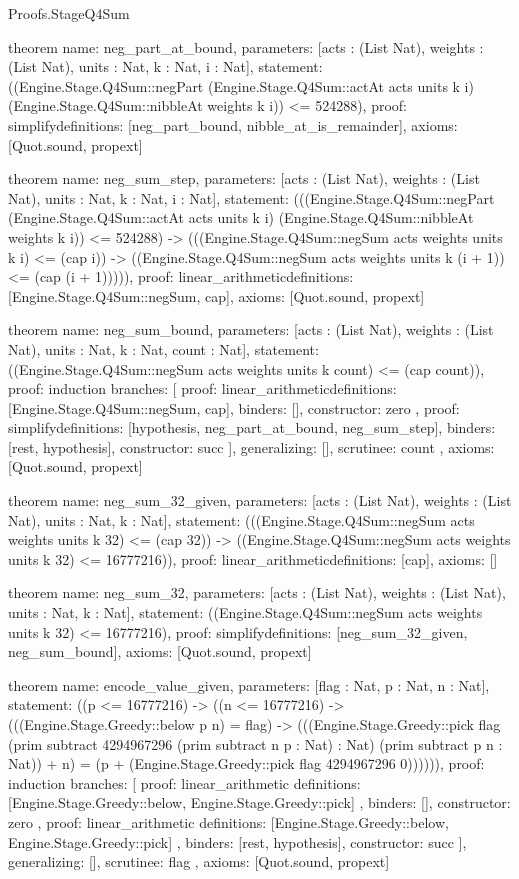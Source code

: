 \begin{lexlean}{Proofs.StageQ4Sum}
\begin{semanticmodule}
theorem{
  name: neg_part_at_bound,
  parameters: [acts : (List Nat), weights : (List Nat), units : Nat, k : Nat, i : Nat],
  statement: ((Engine.Stage.Q4Sum::negPart (Engine.Stage.Q4Sum::actAt acts units k i) (Engine.Stage.Q4Sum::nibbleAt weights k i)) <= 524288),
  proof: simplify{definitions: [neg_part_bound, nibble_at_is_remainder]},
  axioms: [Quot.sound, propext]
}

theorem{
  name: neg_sum_step,
  parameters: [acts : (List Nat), weights : (List Nat), units : Nat, k : Nat, i : Nat],
  statement: (((Engine.Stage.Q4Sum::negPart (Engine.Stage.Q4Sum::actAt acts units k i) (Engine.Stage.Q4Sum::nibbleAt weights k i)) <= 524288) -> (((Engine.Stage.Q4Sum::negSum acts weights units k i) <= (cap i)) -> ((Engine.Stage.Q4Sum::negSum acts weights units k (i + 1)) <= (cap (i + 1))))),
  proof: linear_arithmetic{definitions: [Engine.Stage.Q4Sum::negSum, cap]},
  axioms: [Quot.sound, propext]
}

theorem{
  name: neg_sum_bound,
  parameters: [acts : (List Nat), weights : (List Nat), units : Nat, k : Nat, count : Nat],
  statement: ((Engine.Stage.Q4Sum::negSum acts weights units k count) <= (cap count)),
  proof: induction{
    branches: [
      {
        proof: linear_arithmetic{definitions: [Engine.Stage.Q4Sum::negSum, cap]},
        binders: [],
        constructor: zero
      },
      {
        proof: simplify{definitions: [hypothesis, neg_part_at_bound, neg_sum_step]},
        binders: [rest, hypothesis],
        constructor: succ
      }
    ],
    generalizing: [],
    scrutinee: count
  },
  axioms: [Quot.sound, propext]
}

theorem{
  name: neg_sum_32_given,
  parameters: [acts : (List Nat), weights : (List Nat), units : Nat, k : Nat],
  statement: (((Engine.Stage.Q4Sum::negSum acts weights units k 32) <= (cap 32)) -> ((Engine.Stage.Q4Sum::negSum acts weights units k 32) <= 16777216)),
  proof: linear_arithmetic{definitions: [cap]},
  axioms: []
}

theorem{
  name: neg_sum_32,
  parameters: [acts : (List Nat), weights : (List Nat), units : Nat, k : Nat],
  statement: ((Engine.Stage.Q4Sum::negSum acts weights units k 32) <= 16777216),
  proof: simplify{definitions: [neg_sum_32_given, neg_sum_bound]},
  axioms: [Quot.sound, propext]
}

theorem{
  name: encode_value_given,
  parameters: [flag : Nat, p : Nat, n : Nat],
  statement: ((p <= 16777216) -> ((n <= 16777216) -> (((Engine.Stage.Greedy::below p n) = flag) -> (((Engine.Stage.Greedy::pick flag (prim subtract 4294967296 (prim subtract n p : Nat) : Nat) (prim subtract p n : Nat)) + n) = (p + (Engine.Stage.Greedy::pick flag 4294967296 0)))))),
  proof: induction{
    branches: [
      {
        proof: linear_arithmetic{
          definitions: [Engine.Stage.Greedy::below, Engine.Stage.Greedy::pick]
        },
        binders: [],
        constructor: zero
      },
      {
        proof: linear_arithmetic{
          definitions: [Engine.Stage.Greedy::below, Engine.Stage.Greedy::pick]
        },
        binders: [rest, hypothesis],
        constructor: succ
      }
    ],
    generalizing: [],
    scrutinee: flag
  },
  axioms: [Quot.sound, propext]
}


\end{semanticmodule}
\end{lexlean}
